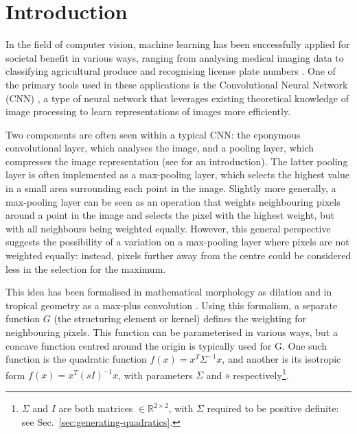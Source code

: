 \documentclass[a4paper, 12pt]{report}
\begin{document}
\tableofcontents


\chapter{Introduction}
\vspace{-0.7cm}
In the field of computer vision, machine learning has been successfully applied for societal benefit in various ways, ranging from analysing medical imaging data \cite{esteva2021deep, jain2015computer} to classifying agricultural produce \cite{wan2020faster, sivaranjani2022overview} and recognising license plate numbers \cite{xie2018new}. One of the primary tools used in these applications is the Convolutional Neural Network (CNN) \cite{le1990handwritten}, a type of neural network that leverages existing theoretical knowledge of image processing to learn representations of images more efficiently.

Two components are often seen within a typical CNN: the eponymous convolutional layer, which analyses the image, and a pooling layer, which compresses the image representation (see \cite{introconvnets} for an introduction). The latter pooling layer is often implemented as a max-pooling layer, which selects the highest value in a small area surrounding each point in the image. Slightly more generally, a max-pooling layer can be seen as an operation that weights neighbouring pixels around a point in the image and selects the pixel with the highest weight, but with all neighbours being weighted equally. However, this general perspective suggests the possibility of a variation on a max-pooling layer where pixels are not weighted equally: instead, pixels further away from the centre could be considered less in the selection for the maximum.

This idea has been formalised in mathematical morphology as dilation \cite{heijmans1996morphological} and in tropical geometry as a max-plus convolution \cite{maragos}. Using this formalism, a separate function $G$ (the structuring element or kernel) defines the weighting for neighbouring pixels. This function can be parameterised in various ways, but a concave function centred around the origin is typically used for G. One such function is the quadratic function $f(x)=x^T\Sigma^{-1}x$, and another is its isotropic form $f(x)=x^T(sI)^{-1}x$, with parameters $\Sigma$ and $s$ respectively\footnote{$\Sigma$ and $I$ are both matrices $\in \mathbb{R}^{2\times2}$, with $\Sigma$ required to be positive definite: see Sec.\ \ref{sec:generating-quadratics}.}\cite{Boomgaard1999NumericalSS}.
\end{document}
